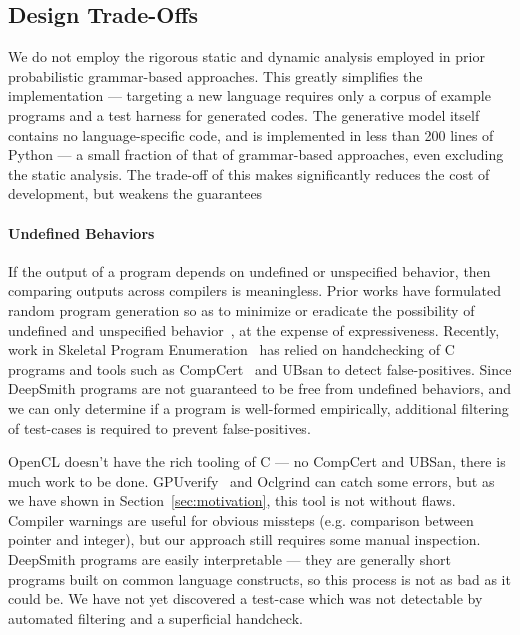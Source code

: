 \subsection{Design Trade-Offs}\label{subsec:discussions}

We do not employ the rigorous static and dynamic analysis employed in prior probabilistic grammar-based approaches. This greatly simplifies the implementation --- targeting a new language requires only a corpus of example programs and a test harness for generated codes. The generative model itself contains no language-specific code, and is implemented in less than 200 lines of Python --- a small fraction of that of grammar-based approaches, even excluding the static analysis. The trade-off of this makes significantly reduces the cost of development, but weakens the guarantees  \cc{\ldots}

\paragraph{Undefined Behaviors} If the output of a program depends on undefined or unspecified behavior, then comparing outputs across compilers is meaningless.  Prior works have formulated random program generation so as to minimize or eradicate the possibility of undefined and unspecified behavior~\cite{Yang2011c,Le2013a,Le2015}, at the expense of expressiveness. Recently, work in Skeletal Program Enumeration~\cite{Zhang2017a} has relied on handchecking of C programs and tools such as CompCert~\cite{Leroy2013} and UBsan to detect false-positives. Since DeepSmith programs are not guaranteed to be free from undefined behaviors, and we can only determine if a program is well-formed empirically, additional filtering of test-cases is required to prevent false-positives.

OpenCL doesn't have the rich tooling of C --- no CompCert and UBSan, there is much work to be done. GPUverify~\cite{Betts2012} and Oclgrind can catch some errors, but as we have shown in Section~\ref{sec:motivation}, this tool is not without flaws. Compiler warnings are useful for obvious missteps (e.g. comparison between pointer and integer), but our approach still requires some manual inspection. DeepSmith programs are easily interpretable --- they are generally short programs built on common language constructs, so this process is not as bad as it could be. We have not yet discovered a test-case which was not detectable by automated filtering and a superficial handcheck.

